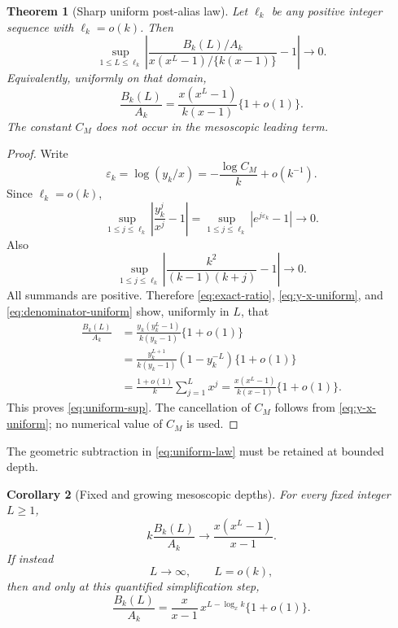 \documentclass[11pt]{article}
\newtheorem{theorem}{Theorem}[section]
\newtheorem{corollary}[theorem]{Corollary}
\theoremstyle{remark}
\begin{document}
\begin{theorem}[Sharp uniform post-alias law]\label{thm:uniform}
Let $\ell_k$ be any positive integer sequence with $\ell_k=o(k)$.  Then
\begin{equation}\label{eq:uniform-sup}
 \sup_{1\le L\le\ell_k}
 \left|
 \frac{B_k(L)/A_k}
 {x(x^L-1)/\{k(x-1)\}}-1
 \right|\longrightarrow0.
\end{equation}
Equivalently, uniformly on that domain,
\begin{equation}\label{eq:uniform-law}
 \boxed{
 \frac{B_k(L)}{A_k}
 =\frac{x(x^L-1)}{k(x-1)}\{1+o(1)\}.}
\end{equation}
The constant $C_M$ does not occur in the mesoscopic leading term.
\end{theorem}

\begin{proof}
Write
\begin{equation}\label{eq:epsilon}
 \varepsilon_k=\log(y_k/x)
 =-\frac{\log C_M}{k}+o(k^{-1}).
\end{equation}
Since $\ell_k=o(k)$,
\begin{equation}\label{eq:y-x-uniform}
 \sup_{1\le j\le\ell_k}
 \left|\frac{y_k^j}{x^j}-1\right|
 =\sup_{1\le j\le\ell_k}|e^{j\varepsilon_k}-1|
 \longrightarrow0.
\end{equation}
Also
\begin{equation}\label{eq:denominator-uniform}
 \sup_{1\le j\le\ell_k}
 \left|\frac{k^2}{(k-1)(k+j)}-1\right|
 \longrightarrow0.
\end{equation}
All summands are positive.  Therefore \eqref{eq:exact-ratio},
\eqref{eq:y-x-uniform}, and \eqref{eq:denominator-uniform} show, uniformly
in $L$, that
\begin{align}
 \frac{B_k(L)}{A_k}
 &=\frac{y_k(y_k^L-1)}{k(y_k-1)}\{1+o(1)\}
 \label{eq:y-geometric}\\
 &=\frac{y_k^{L+1}}{k(y_k-1)}
   (1-y_k^{-L})\{1+o(1)\}
 \label{eq:y-minus-one}\\
 &=\frac{1+o(1)}{k}\sum_{j=1}^Lx^j
 =\frac{x(x^L-1)}{k(x-1)}\{1+o(1)\}.
\end{align}
This proves \eqref{eq:uniform-sup}.  The cancellation of $C_M$ follows from
\eqref{eq:y-x-uniform}; no numerical value of $C_M$ is used.
\end{proof}

The geometric subtraction in \eqref{eq:uniform-law} must be retained at
bounded depth.

\begin{corollary}[Fixed and growing mesoscopic depths]
\label{cor:fixed-growing}
For every fixed integer $L\ge1$,
\begin{equation}\label{eq:fixed-L}
 k\frac{B_k(L)}{A_k}
 \longrightarrow\frac{x(x^L-1)}{x-1}.
\end{equation}
If instead
\begin{equation}\label{eq:growing-L}
 L\longrightarrow\infty,
 \qquad L=o(k),
\end{equation}
then and only at this quantified simplification step,
\begin{equation}\label{eq:master}
 \boxed{
 \frac{B_k(L)}{A_k}
 =\frac{x}{x-1}\,x^{L-\log_xk}\{1+o(1)\}.}
\end{equation}
\end{corollary}
\end{document}
